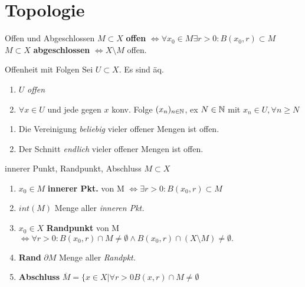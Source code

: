 \section{Topologie}

\begin{definition}{Offen und Abgeschlossen}
  $M \subset X$ \textbf{offen} $\Leftrightarrow \forall x_0 \in M
  \exists r>0: B(x_0,r) \subset M$\\
  $M \subset X$ \textbf{abgeschlossen} $\Leftrightarrow X\setminus M$ offen.
\end{definition}

\begin{satz}{Offenheit mit Folgen}
  Sei \(U\subset X\). Es sind äq.
  \begin{enumerate}[label=(\roman*)]
    \item \(U\) \textit{offen}
    \item \(\forall x\in U\) und jede gegen \(x\) konv.
      Folge \((x_n)_{n\in \mathbb{N}}\), ex \(N\in\mathbb{N}\) mit \(x_n \in U,
      \forall n\geq N\)
  \end{enumerate}
\end{satz}

\begin{lemma}
  \begin{enumerate}[label = (\arabic*)]
    \item Die Vereinigung \textit{beliebig} vieler offener Mengen ist offen.
    \item Der Schnitt \textit{endlich} vieler offener Mengen ist offen.
  \end{enumerate}
\end{lemma}

\begin{definition}{innerer Punkt, Randpunkt, Abschluss}
  $M \subset X$
  \begin{enumerate}[label = (\arabic*)]
    \item $x_0 \in M$ \textbf{innerer Pkt.} von M
      $\Leftrightarrow \exists r>0: B(x_0,r) \subset M$
    \item $int(M)$ Menge aller \textit{inneren Pkt.}
    \item $x_0 \in X$ \textbf{Randpunkt} von M $\Leftrightarrow
      \forall r>0: B(x_0,r) \cap M \neq \emptyset \wedge B(x_0,r)
      \cap (X\setminus M) \neq \emptyset.$
    \item \textbf{Rand} $\partial M$ Menge aller \textit{Randpkt.}
    \item \textbf{Abschluss} $\overline{M} = \{x \in X|\forall r>0 B(x,r)\cap
      M \neq \emptyset$
  \end{enumerate}
\end{definition}

